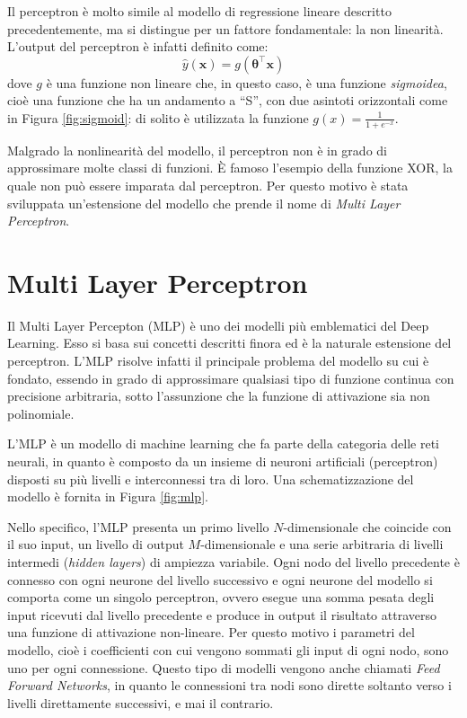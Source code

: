 \documentclass{standalone}
\begin{document}
Il perceptron è molto simile al modello di regressione lineare descritto
precedentemente, ma si distingue per un fattore fondamentale: la non linearità.
L'output del perceptron è infatti definito come:
$$\hat{y}(\bm x) = g(\bm \theta^\intercal \bm x)$$
dove $g$ è una funzione non lineare che, in questo caso, è una funzione
\emph{sigmoidea}, cioè una funzione che ha un andamento a ``S'', con due
asintoti orizzontali come in Figura \ref{fig:sigmoid}: di solito è utilizzata
la funzione $\displaystyle g(x) = \frac{1}{1 + e^{-x}}$.


Malgrado la nonlinearità del modello, il perceptron non è in grado di
approssimare molte classi di funzioni. È famoso l'esempio della funzione XOR,
la quale non può essere imparata dal perceptron. Per questo motivo è stata
sviluppata un'estensione del modello che prende il nome di \emph{Multi Layer
  Perceptron}.

\section{Multi Layer Perceptron}
Il Multi Layer Percepton (MLP) è uno dei modelli più emblematici del Deep
Learning. Esso si basa sui concetti descritti finora ed è la naturale
estensione del perceptron. L'MLP risolve infatti il principale problema del
modello su cui è fondato, essendo in grado di approssimare qualsiasi tipo di
funzione continua con precisione arbitraria, sotto l'assunzione che la
funzione di attivazione sia non polinomiale\cite{universal-approximator}.

L'MLP è un modello di machine learning che fa parte della categoria delle reti
neurali, in quanto è composto da un insieme di neuroni artificiali
(perceptron) disposti su più livelli e interconnessi tra di loro. Una
schematizzazione del modello è fornita in Figura \ref{fig:mlp}.

Nello specifico, l'MLP presenta un primo livello $N$-dimensionale che coincide con il
suo input, un livello di output $M$-dimensionale e una serie arbitraria di
livelli intermedi (\emph{hidden layers}) di ampiezza variabile. Ogni nodo del
livello precedente è connesso con ogni neurone del livello successivo e ogni
neurone del modello si comporta come un singolo perceptron, ovvero esegue una
somma pesata degli input ricevuti dal livello precedente e produce in output il
risultato attraverso una funzione di attivazione non-lineare. Per questo motivo
i parametri del modello, cioè i coefficienti con cui vengono sommati gli input
di ogni nodo, sono uno per ogni connessione. Questo tipo di modelli vengono
anche chiamati \emph{Feed Forward Networks}, in quanto le connessioni tra nodi
sono dirette soltanto verso i livelli direttamente successivi, e mai il
contrario.
\end{document}
